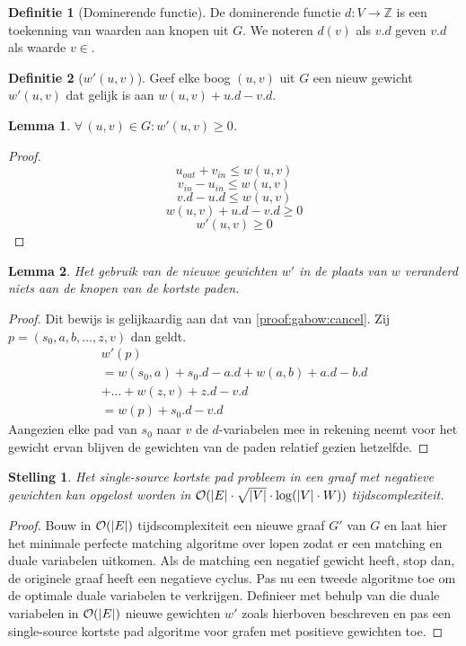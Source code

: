 \documentclass[conference]{IEEEtran}
\newtheorem{theorem}{Stelling}[section]
\newtheorem{lemma}{Lemma}[section]
\theoremstyle{definition}
\newtheorem{definition}{Definitie}[section]
\theoremstyle{remark}
\DeclarePairedDelimiter{\card}{\vert}{\vert}  %
\let \oldforall \forall
\renewcommand{\forall}{\oldforall\,}
\newcommand{\vin}{_{in}}
\newcommand{\vout}{_{out}}
\begin{document}
\begin{definition}[Dominerende functie]
    De dominerende functie $d: V \longrightarrow \mathbb{Z}$ is een toekenning van waarden aan knopen uit $G$. We noteren $d(v)$ als $v.d$ geven $v.d$ als waarde $v\in$.
\end{definition}

\begin{definition}[$w'(u, v)$]
    Geef elke boog $(u, v)$ uit $G$ een nieuw gewicht $w'(u, v)$ dat gelijk is aan $w(u, v) + u.d - v.d$.
\end{definition}

\begin{lemma}
    $\forall (u, v) \in G: w'(u, v) \geq 0$.
\end{lemma}
\begin{proof}
    $$u\vout + v\vin \leq w(u, v)$$
    $$v\vin - u\vin \leq w(u, v)$$
    $$v.d - u.d \leq w(u, v)$$
    $$w(u, v) + u.d - v.d \geq 0$$
    $$w'(u, v) \geq 0$$
\end{proof}

\begin{lemma}
    Het gebruik van de nieuwe gewichten $w'$ in de plaats van $w$ veranderd niets aan de knopen van de kortste paden.
\end{lemma}
\begin{proof}
    Dit bewijs is gelijkaardig aan dat van \ref{proof:gabow:cancel}. Zij $p = (s_0, a, b, \dots, z, v)$ dan geldt.
    \begin{gather*}
        w'(p) \\
        = w(s_0, a) + s_0.d - a.d + w(a, b) + a.d - b.d\\
        + \dots + w(z, v) + z.d - v.d\\
        = w(p) + s_0.d - v.d
    \end{gather*}
    Aangezien elke pad van $s_0$ naar $v$ de $d$-variabelen mee in rekening neemt voor het gewicht ervan blijven de gewichten van de paden relatief gezien hetzelfde.
\end{proof}

\begin{theorem}
    Het single-source kortste pad probleem in een graaf met negatieve gewichten kan opgelost worden in $\mathcal{O}(\card{E} \cdot \sqrt{\card{V}} \cdot \log(\card{V} \cdot W))$ tijdscomplexiteit.
\end{theorem}
\begin{proof}
    Bouw in $\mathcal{O}(\card{E})$ tijdscomplexiteit een nieuwe graaf $G'$ van $G$ en laat hier het minimale perfecte matching algoritme over lopen zodat er een matching en duale variabelen uitkomen. Als de matching een negatief gewicht heeft, stop dan, de originele graaf heeft een negatieve cyclus. Pas nu een tweede algoritme toe om de optimale duale variabelen te verkrijgen. Definieer met behulp van die duale variabelen in $\mathcal{O}(\card{E})$ nieuwe gewichten $w'$ zoals hierboven beschreven en pas een single-source kortste pad algoritme voor grafen met positieve gewichten toe.
\end{proof}
\end{document}
